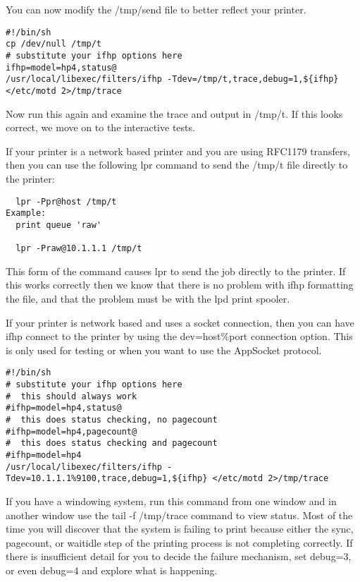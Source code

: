 \documentclass[a4paper]{article}
\begin{document}
You can now modify the {\ttfamily /tmp/send} file to better reflect your
printer.
\begin{tscreen}
\begin{verbatim}
#!/bin/sh
cp /dev/null /tmp/t
# substitute your ifhp options here
ifhp=model=hp4,status@
/usr/local/libexec/filters/ifhp -Tdev=/tmp/t,trace,debug=1,${ifhp} </etc/motd 2>/tmp/trace
\end{verbatim}
\end{tscreen}

Now run this again and examine the trace and output in {\ttfamily /tmp/t}.
If this looks correct,
we move on to the interactive tests.

If your printer is a network based printer and you are using RFC1179 transfers,
then you can use the following {\ttfamily lpr} command to
send the {\ttfamily /tmp/t} file
directly to the printer:
\begin{tscreen}
\begin{verbatim}
  lpr -Ppr@host /tmp/t
Example: 
  print queue 'raw'

  lpr -Praw@10.1.1.1 /tmp/t
\end{verbatim}
\end{tscreen}


 This form of the command causes {\ttfamily lpr} to send the job directly
to the printer.
If this works correctly then we know that there is no problem with {\ttfamily ifhp}
formatting the file,
and that the problem must be with the {\ttfamily lpd} print spooler.

If your printer is network based and uses a socket connection,
then you can have {\ttfamily ifhp} connect to the printer by using the {\ttfamily dev=host\%port}
connection option.
This is only used for testing or when you want to use the AppSocket protocol.
\begin{tscreen}
\begin{verbatim}
#!/bin/sh
# substitute your ifhp options here
#  this should always work
#ifhp=model=hp4,status@
#  this does status checking, no pagecount
#ifhp=model=hp4,pagecount@
#  this does status checking and pagecount
#ifhp=model=hp4
/usr/local/libexec/filters/ifhp -Tdev=10.1.1.1%9100,trace,debug=1,${ifhp} </etc/motd 2>/tmp/trace
\end{verbatim}
\end{tscreen}


If you have a windowing system, run this command from one window and
in another window use the {\ttfamily tail -f /tmp/trace} command to view status.
Most of the time you will discover that the system is failing to print
because either the
{\ttfamily sync},
{\ttfamily pagecount},
or
{\ttfamily waitidle}
step of the printing process is not completing correctly.
If there is insufficient detail for you to decide  the failure mechanism,
set {\ttfamily debug=3}, or even {\ttfamily debug=4} and explore what is happening.
\end{document}
